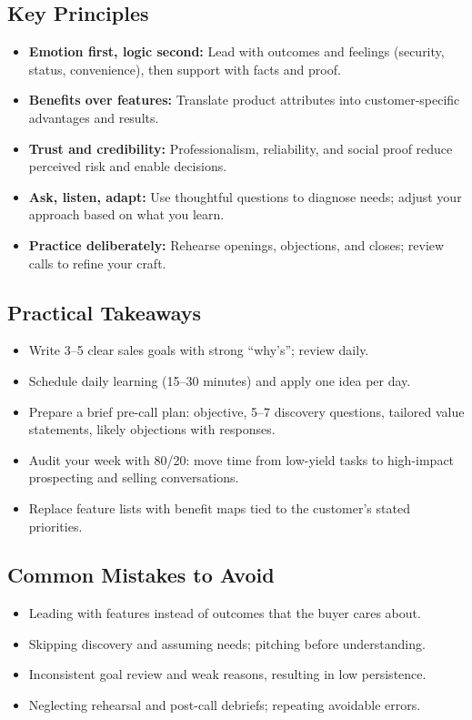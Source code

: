 \subsection*{Key Principles}
\begin{itemize}
    \item \textbf{Emotion first, logic second:} Lead with outcomes and feelings (security, status, convenience), then support with facts and proof.
    \item \textbf{Benefits over features:} Translate product attributes into customer-specific advantages and results.
    \item \textbf{Trust and credibility:} Professionalism, reliability, and social proof reduce perceived risk and enable decisions.
    \item \textbf{Ask, listen, adapt:} Use thoughtful questions to diagnose needs; adjust your approach based on what you learn.
    \item \textbf{Practice deliberately:} Rehearse openings, objections, and closes; review calls to refine your craft.
\end{itemize}

\subsection*{Practical Takeaways}
\begin{itemize}
    \item Write 3--5 clear sales goals with strong “why’s”; review daily.
    \item Schedule daily learning (15--30 minutes) and apply one idea per day.
    \item Prepare a brief pre-call plan: objective, 5--7 discovery questions, tailored value statements, likely objections with responses.
    \item Audit your week with 80/20: move time from low-yield tasks to high-impact prospecting and selling conversations.
    \item Replace feature lists with benefit maps tied to the customer’s stated priorities.
\end{itemize}

\subsection*{Common Mistakes to Avoid}
\begin{itemize}
    \item Leading with features instead of outcomes that the buyer cares about.
    \item Skipping discovery and assuming needs; pitching before understanding.
    \item Inconsistent goal review and weak reasons, resulting in low persistence.
    \item Neglecting rehearsal and post-call debriefs; repeating avoidable errors.
\end{itemize}

